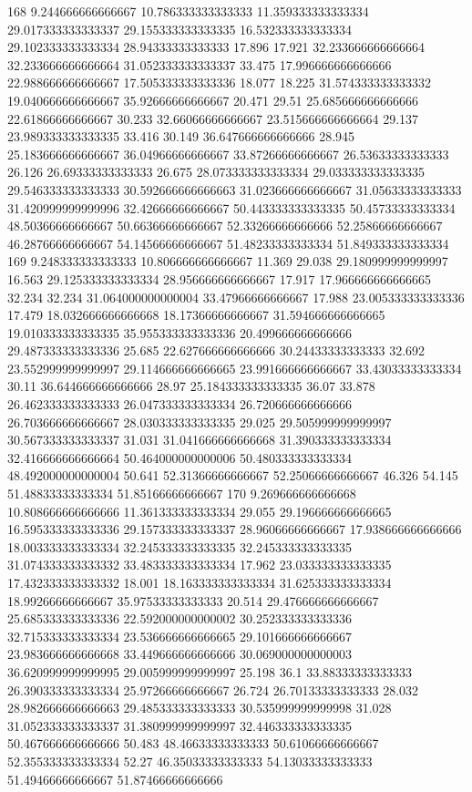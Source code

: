 168 9.244666666666667 10.786333333333333 11.359333333333334 29.017333333333337 29.155333333333335 16.532333333333334 29.102333333333334 28.94333333333333 17.896 17.921 32.233666666666664 32.233666666666664 31.052333333333337 33.475 17.996666666666666 22.988666666666667 17.505333333333336 18.077 18.225 31.574333333333332 19.040666666666667 35.92666666666667 20.471 29.51 25.685666666666666 22.61866666666667 30.233 32.66066666666667 23.515666666666664 29.137 23.989333333333335 33.416 30.149 36.647666666666666 28.945 25.183666666666667 36.04966666666667 33.87266666666667 26.53633333333333 26.126 26.69333333333333 26.675 28.073333333333334 29.033333333333335 29.546333333333333 30.592666666666663 31.023666666666667 31.05633333333333 31.420999999999996 32.42666666666667 50.443333333333335 50.45733333333334 48.50366666666667 50.66366666666667 52.33266666666666 52.25866666666667 46.28766666666667 54.14566666666667 51.48233333333334 51.849333333333334
169 9.248333333333333 10.806666666666667 11.369 29.038 29.180999999999997 16.563 29.125333333333334 28.956666666666667 17.917 17.966666666666665 32.234 32.234 31.064000000000004 33.47966666666667 17.988 23.005333333333336 17.479 18.032666666666668 18.17366666666667 31.594666666666665 19.010333333333335 35.955333333333336 20.499666666666666 29.487333333333336 25.685 22.627666666666666 30.24433333333333 32.692 23.552999999999997 29.114666666666665 23.991666666666667 33.43033333333334 30.11 36.644666666666666 28.97 25.184333333333335 36.07 33.878 26.462333333333333 26.047333333333334 26.720666666666666 26.703666666666667 28.030333333333335 29.025 29.505999999999997 30.567333333333337 31.031 31.041666666666668 31.390333333333334 32.416666666666664 50.464000000000006 50.480333333333334 48.492000000000004 50.641 52.31366666666667 52.25066666666667 46.326 54.145 51.48833333333334 51.85166666666667
170 9.269666666666668 10.808666666666666 11.361333333333334 29.055 29.196666666666665 16.595333333333336 29.157333333333337 28.96066666666667 17.938666666666666 18.003333333333334 32.245333333333335 32.245333333333335 31.074333333333332 33.483333333333334 17.962 23.033333333333335 17.432333333333332 18.001 18.163333333333334 31.625333333333334 18.99266666666667 35.97533333333333 20.514 29.476666666666667 25.685333333333336 22.592000000000002 30.252333333333336 32.715333333333334 23.536666666666665 29.101666666666667 23.983666666666668 33.449666666666666 30.069000000000003 36.620999999999995 29.005999999999997 25.198 36.1 33.88333333333333 26.390333333333334 25.97266666666667 26.724 26.70133333333333 28.032 28.982666666666663 29.485333333333333 30.535999999999998 31.028 31.052333333333337 31.380999999999997 32.446333333333335 50.467666666666666 50.483 48.46633333333333 50.61066666666667 52.355333333333334 52.27 46.35033333333333 54.13033333333333 51.49466666666667 51.87466666666666
